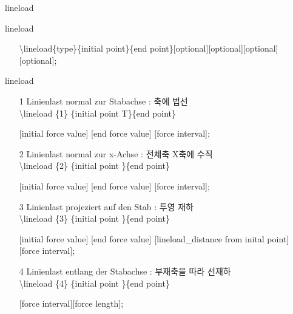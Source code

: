 \documentclass[ aspectratio=169,  12pt,blue,xcolor=pdftex,dvipsnames,table,handout,notes]{beamer}
\begin{document}
		\begin{frame}[t]{lineload}
 
			\begin{block}{lineload}
			\begin{itemize}
			\item[] \textbackslash lineload\{type\}\{initial point\}\{end point\}[optional][optional][optional][optional];
			\end{itemize}
			\end{block}


			\begin{block}{lineload}
			\begin{itemize}

			\item[1] Linienlast normal zur Stabachse : 축에 법선\\
					\textbackslash lineload \{1\}
					\{initial point T\}\{end point\} \par \hspace{2cm}
					[initial force value]
					[end force value]
					[force interval];

			\item[2] Linienlast normal zur x-Achse : 전체축 X축에 수직\\
					\textbackslash lineload \{2\}
					\{initial point \}\{end point\} \par \hspace{2cm}
					[initial force value]
					[end force value]
					[force interval];

			\item[3] Linienlast projeziert auf den Stab : 투영 재하\\
					\textbackslash lineload \{3\}
					\{initial point \}\{end point\}	\par \hspace{2cm}
					[initial force value]
					[end force value]
					[lineload\_distance from inital point]
					[force interval];

			\item[4] Linienlast entlang der Stabachse : 부재축을 따라 선재하\\
					\textbackslash lineload \{4\}
					\{initial point \}\{end point\} \par \hspace{2cm}
					[force interval][force length];

			\end{itemize}
			\end{block}


			\begin{columns}[t]


\end{columns}
\end{frame}
\end{document}
